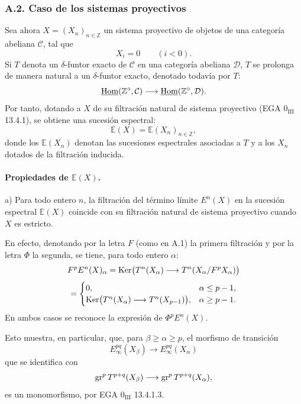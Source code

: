 \subsubsection*{A.2. Caso de los sistemas proyectivos}
Sea ahora \(X=(X_n)_{n\in\mathbb Z}\) un sistema proyectivo de objetos de una categoría abeliana \(\mathcal C\), tal que
\[
X_i=0\qquad(i<0).
\]
Si \(T\) denota un \(\delta\)-funtor exacto de \(\mathcal C\) en una categoría abeliana \(\mathcal D\), \(T\) se prolonga de manera natural a un \(\delta\)-funtor exacto, denotado todavía por \(T\):
\[
\underline{\operatorname{Hom}}(\mathbb Z^\circ,\mathcal C)\longrightarrow \underline{\operatorname{Hom}}(\mathbb Z^\circ,\mathcal D).
\]
Por tanto, dotando a \(X\) de su filtración natural de sistema proyectivo (EGA \(0_{\mathrm{III}}\) 13.4.1), se obtiene una sucesión espectral:
\[
\mathbb{E}(X)=\mathbb{E}(X_n)_{n\in\mathbb Z},
\]
donde los \(\mathbb{E}(X_n)\) denotan las sucesiones espectrales asociadas a \(T\) y a los \(X_n\) dotados de la filtración inducida.

\paragraph{Propiedades de \(\mathbb{E}(X)\).}
a) Para todo entero \(n\), la filtración del término límite \(E^n(X)\) en la sucesión espectral \(\mathbb{E}(X)\) coincide con su filtración natural de sistema proyectivo cuando \(X\) es estricto.

En efecto, denotando por la letra \(F\) (como en A.1) la primera filtración y por la letra \(\Phi\) la segunda, se tiene, para todo entero \(\alpha\):
\[
F^pE^n(X)_\alpha
=\operatorname{Ker}\bigl(T^n(X_\alpha)\longrightarrow T^n(X_\alpha/F^pX_\alpha)\bigr)
\]
\[
=
\begin{cases}
0,& \alpha\le p-1,\\
\operatorname{Ker}\bigl(T^n(X_\alpha)\longrightarrow T^n(X_{p-1})\bigr),& \alpha\ge p-1.
\end{cases}
\]
En ambos casos se reconoce la expresión de \(\Phi^pE^n(X)\).

Esto muestra, en particular, que, para \(\beta\ge\alpha\ge p\), el morfismo de transición
\[
E_\infty^{pq}(X_\beta)\longrightarrow E_\infty^{pq}(X_\alpha)
\]
que se identifica con
\[
\operatorname{gr}^pT^{p+q}(X_\beta)\longrightarrow
\operatorname{gr}^pT^{p+q}(X_\alpha),
\]
es un monomorfismo, por EGA \(0_{\mathrm{III}}\) 13.4.1.3.


